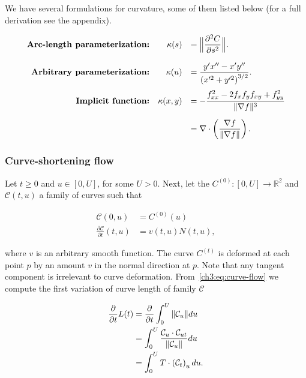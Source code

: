 We have several formulations for curvature, some of them listed below (for a full derivation see the appendix). 

\begin{align*}
\begin{array}{rrl}
	\textbf{Arc-length parameterization:} & \displaystyle \kappa(s) &= \displaystyle \Big\lVert \frac{\partial^2 C}{\partial s^2} \Big\rVert. \\[1.5em]	
	\textbf{Arbitrary parameterization:} & \displaystyle \kappa(u) &= \displaystyle \frac{y'x'' - x'y''}{\left( x'^2 + y'^2 \right)^{3/2}}. \\[1.5em]
	\textbf{Implicit function:} & \displaystyle \kappa(x,y) &= \displaystyle -\frac{f_{xx}^2 - 2f_xf_yf_{xy} + f_{yy}^2}{\lVert\nabla f\rVert^3} \\[1.5em]
	&&= \displaystyle \nabla \cdot \left( \frac{\nabla f}{\lVert\nabla f\rVert} \right).
\end{array}
\end{align*}


\subsubsection{Curve-shortening flow}
\label{ch3:sec:curve-shortening-flow}

Let $ t\geq 0$ and $u \in [0,U]$, for some $U>0$. Next, let the $C^{(0)}:[0,U] \rightarrow \mathbb{R}^2$ and $\mathcal{C}(t,u)$ a family of curves such that

\begin{align}
	\mathcal{C}(0,u) & = C^{(0)}(u) \\
	\frac{\partial \mathcal{C}}{\partial t}(t,u) &= v(t,u) N(t,u),
	\label{ch3:eq:curve-normal-flow}
\end{align}

where $v$ is an arbitrary smooth function. The curve ${C}^{(t)}$ is deformed at each point $p$ by an amount $v$ in the normal direction at $p$. Note that any tangent component is irrelevant to curve deformation. From~\cref{ch3:eq:curve-flow} we compute the first variation of curve length of family $\mathcal{C}$

\begin{align*}
	\frac{\partial }{\partial t}L(t) &= \frac{\partial}{\partial t}\int_{0}^{U}{\lVert \mathcal{C}_u \rVert du} \\
	&= \int_{0}^{U}{ \frac{ \mathcal{C}_u \cdot \mathcal{C}_{ut} }{\lVert\mathcal{C}_u\rVert } du} \\
	&= \int_{0}^{U}{ T \cdot \left( \mathcal{C}_{t} \right)_u  du}.
\end{align*}


